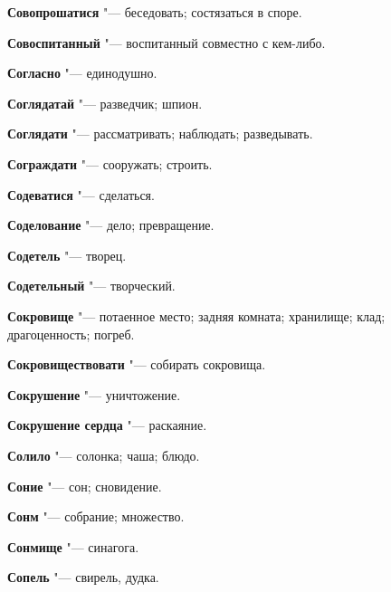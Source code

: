 \begin{mymulticols}{2}
\noindent\textbf{Совопрошатися} "--- беседовать; состязаться в споре. 




\noindent\textbf{Совоспитанный} "--- воспитанный совместно с кем-либо. 




\noindent\textbf{Согласно} "--- единодушно. 




\noindent\textbf{Соглядатай} "--- разведчик; шпион. 




\noindent\textbf{Соглядати} "--- рассматривать; наблюдать; разведывать. 




\noindent\textbf{Сограждати} "--- сооружать; строить. 




\noindent\textbf{Содеватися} "--- сделаться. 




\noindent\textbf{Соделование} "--- дело; превращение. 




\noindent\textbf{Содетель} "--- творец. 




\noindent\textbf{Содетельный} "--- творческий. 




\noindent\textbf{Сокровище} "--- потаенное место; задняя комната; хранилище; клад; драгоценность; погреб. 




\noindent\textbf{Сокровиществовати} "--- собирать сокровища. 




\noindent\textbf{Сокрушение} "--- уничтожение. 




\noindent\textbf{Сокрушение сердца} "--- раскаяние. 




\noindent\textbf{Солило} "--- солонка; чаша; блюдо. 




\noindent\textbf{Соние} "--- сон; сновидение. 




\noindent\textbf{Сонм} "--- собрание; множество. 




\noindent\textbf{Сонмище} "--- синагога. 




\noindent\textbf{Сопель} "--- свирель, дудка. 





\end{mymulticols}
